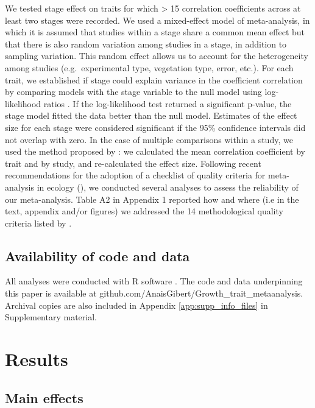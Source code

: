 \documentclass[a4paper]{article}\usepackage[]{graphicx}\usepackage[]{color}
\begin{document}
We tested stage effect on traits for which > 15 correlation coefficients across at least two stages were recorded. We used a mixed-effect model of meta-analysis, in which it is assumed that studies within a stage share a common mean effect but that there is also random variation among studies in a stage, in addition to sampling variation. This random effect allows us to account for the heterogeneity among studies (e.g.~experimental type, vegetation type, error, etc.). For each trait, we established if stage could explain variance in the coefficient correlation by comparing models with the stage variable to the null model using log-likelihood ratios \citep{Zuur:2009cfa}. If the log-likelihood test returned a significant p-value, the stage model fitted the data better than the null model. Estimates of the effect size for each stage were considered significant if the 95\% confidence intervals did not overlap with zero. In the case of multiple comparisons within a study, we used the method proposed by \citet{Borenstein:2009um}: we calculated the mean correlation coefficient by trait and by study, and re-calculated the effect size. Following recent recommendations for the adoption of a checklist of quality criteria for meta-analysis in ecology (\citealt{Koricheva:2014ku}), we conducted several analyses to assess the reliability of our meta-analysis. Table A2 in Appendix 1 reported how and where (i.e in the text, appendix and/or figures) we addressed the 14 methodological quality criteria listed by \citet{Koricheva:2014ku}. 


\subsection*{Availability of code and data}\label{code}

All analyses were conducted with R software \citep{Ralanguageanden:2014wf}. The code and data underpinning this paper is available at github.com/AnaisGibert/Growth\_trait\_metaanalysis. Archival copies are also included in Appendix \ref{app:supp_info_files} in Supplementary material.

\section*{Results}\label{results}

\subsection*{Main effects}
\end{document}
